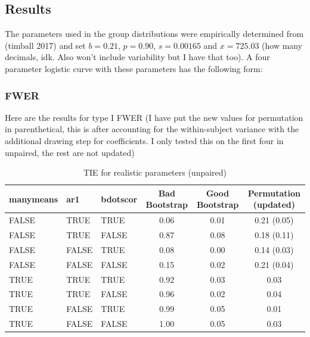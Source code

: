 \documentclass{article}
\begin{document}
\subsection{Results}

The parameters used in the group distributions were empirically determined from (timball 2017) and set $b = 0.21$, $p = 0.90$, $s = 0.00165$ and $x = 725.03$ (how  many decimals, idk. Also won't include variability but I have that too). A four parameter logistic curve with these parameters has the following form:




\subsubsection{FWER}

Here are the results for type I FWER (I have put the new values for permutation in parenthetical, this is after accounting for the within-subject variance with the additional drawing step for coefficients. I only tested this on the first four in unpaired, the rest are not updated)

\begin{table}[H]
\centering
\begin{tabular}{lllccc}
  \hline
  manymeans & ar1 & bdotscor &  Bad Bootstrap & Good Bootstrap & Permutation (updated) \\ 
  \hline
FALSE & TRUE & TRUE & 0.06 & 0.01 & 0.21  (0.05) \\ 
  FALSE & TRUE & FALSE & 0.87 & 0.08 & 0.18  (0.11) \\ 
  FALSE & FALSE & TRUE & 0.08 & 0.00 & 0.14  (0.03) \\ 
  FALSE & FALSE & FALSE & 0.15 & 0.02 & 0.21  (0.04) \\ 
  TRUE & TRUE & TRUE & 0.92 & 0.03 & 0.03 \\ 
  TRUE & TRUE & FALSE & 0.96 & 0.02 & 0.04 \\ 
  TRUE & FALSE & TRUE & 0.99 & 0.05 & 0.01 \\ 
  TRUE & FALSE & FALSE & 1.00 & 0.05 & 0.03 \\  
   \hline
\end{tabular}
\caption{TIE for realistic parameters (unpaired)}
\end{table}
\end{document}

